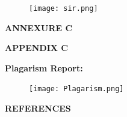 \documentclass[12pt]{report}
\begin{document}
\vspace{1cm}

\begin{figure}[h]
\centering
\texttt{[image: sir.png]}

\end{figure}





\vspace{15 cm}

\clearpage


\centering
\Large\textbf{ANNEXURE C}

\centering

\Large\textbf{APPENDIX C}\\
\justifying
\setlength{\parindent}{4em}
\setlength{\parskip}{0.5em}
\renewcommand{\baselinestretch}{1.5}
\large
\raggedright\textbf{Plagarism Report:}
\vspace{1cm}

\begin{figure}[h]
\centering
\texttt{[image: Plagarism.png]}

\end{figure}
\vspace{15 cm}


\centering
\Large\textbf{REFERENCES}
\justifying
\setlength{\parindent}{4em}
\setlength{\parskip}{0.5em}
\renewcommand{\baselinestretch}{1.5}
\normalsize
\end{document}
